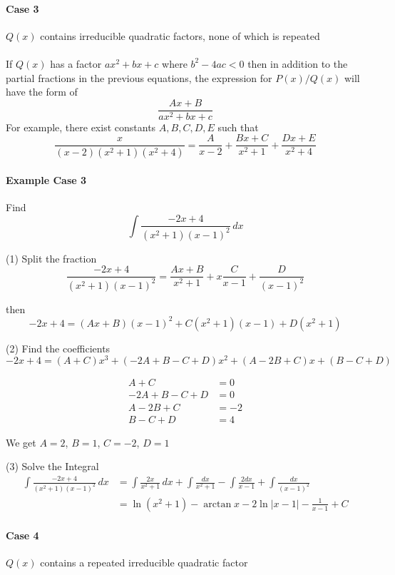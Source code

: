\documentclass[12pt]{article}
\begin{document}
\paragraph{Case 3} $Q(x)$ contains irreducible quadratic factors, none of which is repeated \\ \\

If $Q(x)$ has a factor $ax^2 + bx + c$ where $b^2 - 4ac < 0$ then in addition to the partial fractions in the previous equations, the 
expression for $P(x)/Q(x)$ will have the form of
\[
    \frac{Ax + B}{ax^2 + bx + c} 
\]
For example, there exist constants $A, B, C, D, E$ such that
\[
    \frac{x}{(x - 2)(x^2 + 1)(x^2 + 4)} = \frac{A}{x - 2} + \frac{Bx + C}{x^2 + 1} + \frac{Dx + E}{x^2 + 4} 
\]

\paragraph{Example Case 3} Find
\[
    \int \frac{ - 2x + 4}{(x^2 + 1)(x - 1)^2} \, dx 
\]

(1) Split the fraction
\[
    \frac{ - 2x + 4}{(x^2 + 1)(x - 1)^2} = \frac{Ax + B}{x^2 + 1} + x\frac{C}{x - 1} + \frac{D}{(x - 1)^2} 
\]

then
\[
    - 2x + 4 = (Ax + B)(x - 1)^2 + C(x^2 + 1)(x - 1) + D(x^2 + 1)
\]

(2) Find the coefficients 
\[
    - 2x + 4 = (A + C)x^3 + ( - 2A + B - C + D)x^2 + (A - 2B + C)x + (B - C + D)
\]

\begin{align*} 
    A + C &= 0 \\
    - 2A + B - C + D &= 0 \\
    A - 2B + C &= - 2 \\
    B - C + D &= 4
\end{align*}

We get $A = 2$, $B = 1$, $C = -2$, $D = 1$

(3) Solve the Integral 
\begin{align*} 
    \int \frac{ - 2x + 4}{(x^2 + 1)(x - 1)^2} \, dx &= \int \frac{2x}{x^2 + 1} \, dx + \int \frac{dx}{x^2 + 1} - \int \frac{2 dx}{x - 1} + \int \frac{dx}{(x - 1)^2} \\
    &= \ln (x^2 + 1) - \arctan x - 2 \ln|x - 1| - \frac{1}{x - 1} + C
\end{align*}

\paragraph{Case 4} $Q(x)$ contains a repeated irreducible quadratic factor \\ \\
\end{document}

